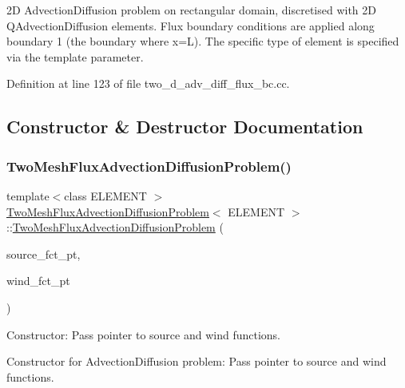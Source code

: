 2D Advection\+Diffusion problem on rectangular domain, discretised with 2D Q\+Advection\+Diffusion elements. Flux boundary conditions are applied along boundary 1 (the boundary where x=L). The specific type of element is specified via the template parameter. 

Definition at line 123 of file two\+\_\+d\+\_\+adv\+\_\+diff\+\_\+flux\+\_\+bc.\+cc.



\subsection{Constructor \& Destructor Documentation}
\mbox{\label{classTwoMeshFluxAdvectionDiffusionProblem_a7f3ec24317465521cb84212d1c2dc662}} 
\subsubsection{\texorpdfstring{Two\+Mesh\+Flux\+Advection\+Diffusion\+Problem()}{TwoMeshFluxAdvectionDiffusionProblem()}}
{\footnotesize\ttfamily template$<$class E\+L\+E\+M\+E\+NT $>$ \\
\hyperlink{classTwoMeshFluxAdvectionDiffusionProblem}{Two\+Mesh\+Flux\+Advection\+Diffusion\+Problem}$<$ E\+L\+E\+M\+E\+NT $>$\+::\hyperlink{classTwoMeshFluxAdvectionDiffusionProblem}{Two\+Mesh\+Flux\+Advection\+Diffusion\+Problem} (\begin{DoxyParamCaption}\item[{Advection\+Diffusion\+Equations$<$ 2 $>$\+::Advection\+Diffusion\+Source\+Fct\+Pt}]{source\+\_\+fct\+\_\+pt,  }\item[{Advection\+Diffusion\+Equations$<$ 2 $>$\+::Advection\+Diffusion\+Wind\+Fct\+Pt}]{wind\+\_\+fct\+\_\+pt }\end{DoxyParamCaption})}



Constructor\+: Pass pointer to source and wind functions. 

Constructor for Advection\+Diffusion problem\+: Pass pointer to source and wind functions. 

